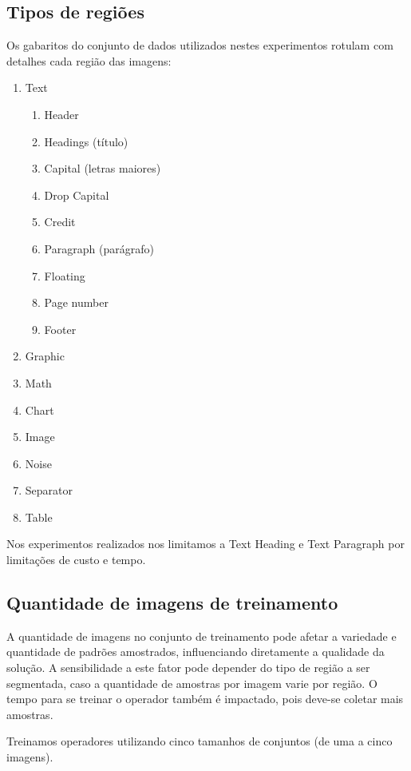 \documentclass[a4paper,11pt]{article}
\begin{document}
  \subsection{Tipos de regiões}

    Os gabaritos do conjunto de dados utilizados nestes experimentos rotulam com detalhes cada região das imagens:

    \begin{enumerate}
      \item Text
      \begin{enumerate}
        \item Header 
        \item Headings (título)
        \item Capital (letras maiores)
        \item Drop Capital
        \item Credit
        \item Paragraph (parágrafo)
        \item Floating
        \item Page number
        \item Footer
      \end{enumerate}
      \item Graphic
      \item Math
      \item Chart
      \item Image
      \item Noise
      \item Separator
      \item Table
    \end{enumerate}

    Nos experimentos realizados nos limitamos a Text Heading e Text Paragraph por limitações de custo e tempo.

  \subsection{Quantidade de imagens de treinamento}

    A quantidade de imagens no conjunto de treinamento pode afetar a variedade e quantidade de padrões amostrados, influenciando diretamente a qualidade da solução. A sensibilidade a este fator pode depender do tipo de região a ser segmentada, caso a quantidade de amostras por imagem varie por região. O tempo para se treinar o operador também é impactado, pois deve-se coletar mais amostras.

    Treinamos operadores utilizando cinco tamanhos de conjuntos (de uma a cinco imagens).
\end{document}
